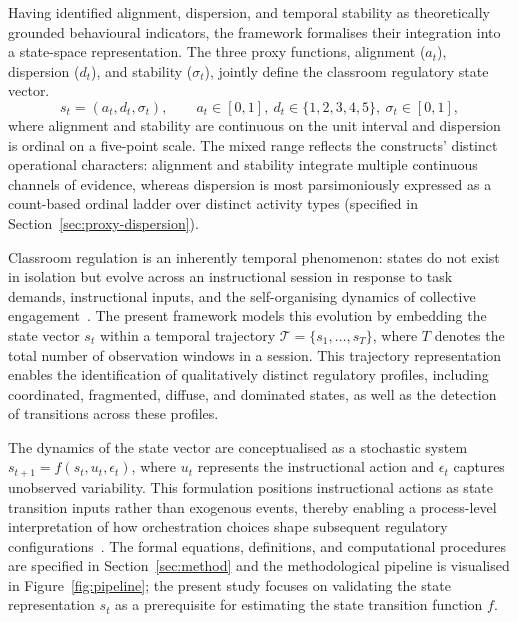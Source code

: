 \documentclass[preprint,12pt,authoryear]{elsarticle}
\begin{document}
Having identified alignment, dispersion, and temporal stability as theoretically grounded behavioural indicators, the framework formalises their integration into a state-space representation. The three proxy functions, alignment ($a_t$), dispersion ($d_t$), and stability ($\sigma_t$), jointly define the classroom regulatory state vector.
\begin{equation}
s_t = (a_t, d_t, \sigma_t), \qquad a_t \in [0,1],\ d_t \in \{1,2,3,4,5\},\ \sigma_t \in [0,1],
\label{eq:state_vector}
\end{equation}
where alignment and stability are continuous on the unit interval and dispersion is ordinal on a five-point scale. The mixed range reflects the constructs' distinct operational characters: alignment and stability integrate multiple continuous channels of evidence, whereas dispersion is most parsimoniously expressed as a count-based ordinal ladder over distinct activity types (specified in Section~\ref{sec:proxy-dispersion}).

Classroom regulation is an inherently temporal phenomenon: states do not exist in isolation but evolve across an instructional session in response to task demands, instructional inputs, and the self-organising dynamics of collective engagement~\citep{molenaar2021}. The present framework models this evolution by embedding the state vector $s_t$ within a temporal trajectory $\mathcal{T} = \{s_1, \ldots, s_T\}$, where $T$ denotes the total number of observation windows in a session. This trajectory representation enables the identification of qualitatively distinct regulatory profiles, including coordinated, fragmented, diffuse, and dominated states, as well as the detection of transitions across these profiles.

The dynamics of the state vector are conceptualised as a stochastic system $s_{t+1} = f(s_t, u_t, \epsilon_t)$, where $u_t$ represents the instructional action and $\epsilon_t$ captures unobserved variability. This formulation positions instructional actions as state transition inputs rather than exogenous events, thereby enabling a process-level interpretation of how orchestration choices shape subsequent regulatory configurations~\citep{molenaar2021, zheng2022}. The formal equations, definitions, and computational procedures are specified in Section~\ref{sec:method} and the methodological pipeline is visualised in Figure~\ref{fig:pipeline}; the present study focuses on validating the state representation $s_t$ as a prerequisite for estimating the state transition function $f$.
\end{document}
